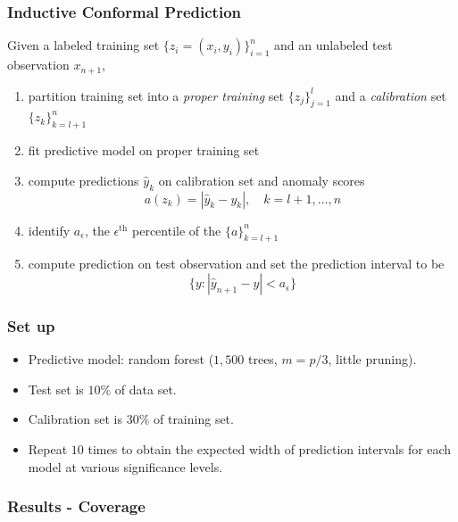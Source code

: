 \documentclass{beamer}
\begin{document}
\begin{frame} \frametitle{Inductive Conformal Prediction}

Given a labeled training set $\{z_i = (x_i, y_i)\}_{i=1}^n$ and an unlabeled test observation $x_{n+1}$,
\begin{enumerate}
	\item partition training set into a \textit{proper training} set $\{z_j\}_{j=1}^l$ and a \textit{calibration} set $\{z_k \}_{k=l+1}^n$
	\item fit predictive model on proper training set
	\item compute predictions $\hat{y}_k$ on calibration set and anomaly scores
	$$a(z_k) = |\hat{y}_k - y_k|, \quad k = l+1, \dots, n$$
	\item identify $a_\epsilon$, the $\epsilon^{\text{th}}$ percentile of the $\{a\}_{k=l+1}^n$
	\item compute prediction on test observation and set the prediction interval to be
	$$\{y: |\hat{y}_{n+1} - y| < a_\epsilon\}$$
	\end{enumerate}
\end{frame}


\begin{frame} \frametitle{Set up}
\begin{itemize}
	\item Predictive model: random forest ($1,500$ trees, $m=p/3$, little pruning).
	\item Test set is $10\%$ of data set.
	\item Calibration set is $30\%$ of training set.
	\item Repeat $10$ times to obtain the expected width of prediction intervals for each model at various significance levels.
\end{itemize}
\end{frame}

\begin{frame} \frametitle{Results - Coverage}  

\end{frame}
\end{document}
